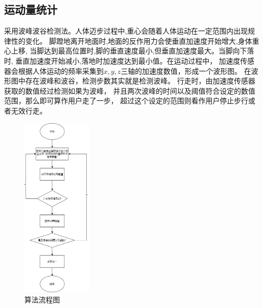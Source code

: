 \documentclass[scheme=chinese,a4paper]{article}
\begin{document}
\subsection{运动量统计}
采用波峰波谷检测法。人体迈步过程中,重心会随着人体运动在一定范围内出现规律性的变化。
脚蹬地离开地面时,地面的反作用力会使垂直加速度开始增大,身体重心上移,
当脚达到最高位置时,脚的垂直速度最小,但垂直加速度最大。当脚向下落时,
垂直加速度开始减小,落地时加速度达到最小值。在运动过程中，
加速度传感器会根据人体运动的频率采集到$x,y,z$三轴的加速度数值，形成一个波形图。
在波形图中存在波峰和波谷，检测步数其实就是检测波峰。
行走时，由加速度传感器获取的数值经过检测如果为波峰，
并且两次波峰的时间以及阈值符合设定的数值范围，那么即可算作用户走了一步，
超过这个设定的范围则看作用户停止步行或者无效行走。
\begin{figure}[H]
    \centering
    \includegraphics[width=0.3\textwidth]{algritom.png}
    \caption{算法流程图}
\end{figure}

\end{document}
